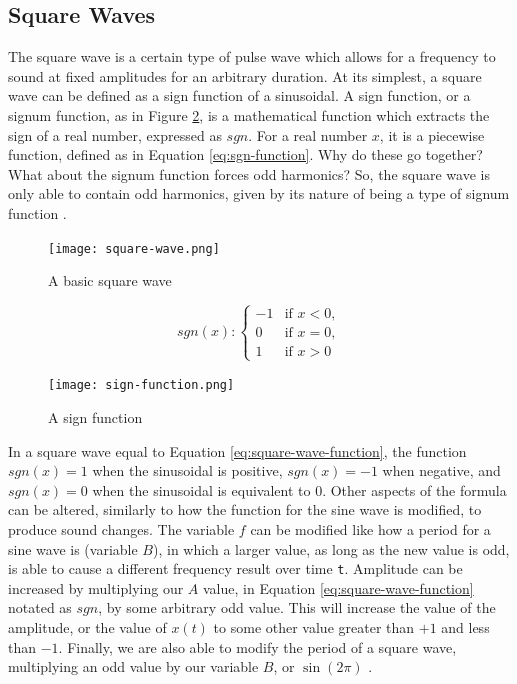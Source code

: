 \subsection{Square Waves}

The square wave is a certain type of pulse wave which allows for a frequency to sound at fixed amplitudes for an arbitrary duration. At its simplest, a square wave can be defined as a sign function of a sinusoidal. A sign function, or a signum function, as in Figure \ref{fig:sign-function}, is a mathematical function which extracts the sign of a real number, expressed as $sgn$. For a real number $x$, it is a piecewise function, defined as in Equation \ref{eq:sgn-function}. Why do these go together? What about the signum function forces odd harmonics? So, the square wave is only able to contain odd harmonics, given by its nature of being a type of signum function \cite{Case_2007}.

\begin{figure}[ht]
  \centering
  \texttt{[image: square-wave.png]}
  \caption{A basic square wave}
  \label{fig:square-wave}
\end{figure}

\begin{equation}
	sgn (x): \begin{cases}
		-1 & \textrm{if } x < 0, \\
		0 & \textrm{if } x = 0, \\
		1 & \textrm{if } x > 0
	\end{cases}
	\label{eq:sgn-function}
\end{equation}

\begin{figure}[ht]
  \centering
  \texttt{[image: sign-function.png]}
  \caption{A sign function}
  \label{fig:sign-function}
\end{figure}

In a square wave equal to Equation \ref{eq:square-wave-function}, the function $sgn(x) = 1$ when the sinusoidal is positive, $sgn(x) = -1$ when negative, and $sgn(x) = 0$ when the sinusoidal is equivalent to 0. Other aspects of the formula can be altered, similarly to how the function for the sine wave is modified, to produce sound changes. The variable $f$ can be modified like how a period for a sine wave is (variable $B$), in which a larger value, as long as the new value is odd, is able to cause a different frequency result over time \texttt{t}. Amplitude can be increased by multiplying our $A$ value, in Equation \ref{eq:square-wave-function} notated as $sgn$, by some arbitrary odd value. This will increase the value of the amplitude, or the value of $x(t)$ to some other value greater than $+1$ and less than $-1$. Finally, we are also able to modify the period of a square wave, multiplying an odd value by our variable $B$, or $\sin(2\pi)$ \cite{Case_2007}.

